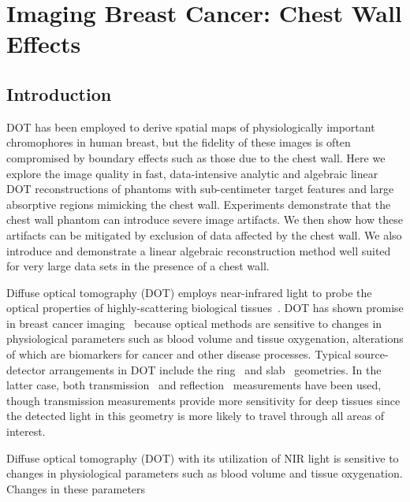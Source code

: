\chapter{Imaging Breast Cancer: Chest Wall Effects}


\section{Introduction}

DOT has been employed to derive spatial maps of physiologically important chromophores in human breast, but the fidelity of these images is often compromised by boundary effects such as those due to the chest wall.  Here we explore the image quality in fast, data-intensive analytic and algebraic linear DOT reconstructions of phantoms with sub-centimeter target features and large absorptive regions mimicking the chest wall. Experiments demonstrate that the chest wall phantom can introduce severe image artifacts.  We then show how these artifacts can be mitigated by exclusion of data affected by the chest wall. We also introduce and demonstrate a linear algebraic reconstruction method well suited for very large data sets in the presence of a chest wall.

Diffuse optical tomography (DOT) employs near-infrared light to probe the optical properties of highly-scattering biological tissues~\cite{arridge_99_1,boas_01_1,arridge_09_1}. DOT has shown
promise in breast cancer imaging~\cite{colak_99_1,hawrysz_00_1,mcbride_01_1,culver_03_1,intes_03_1,li_03_1,choe_05_1,yates_05_1,corlu_07_1,cerussi_07_1,choe_09_1,durduran_10_1} because optical methods are sensitive to changes in physiological parameters such as blood volume and tissue oxygenation, alterations of which are biomarkers for cancer and other disease processes.  Typical source-detector arrangements in DOT include the ring~\cite{pogue_95_1} and slab~\cite{grosenick_05_1,pifferi_03_1,choe_09_1} geometries. In the latter case, both transmission~\cite{choe_09_1} and reflection~\cite{ge_08_1} measurements have been used, though transmission measurements provide more sensitivity for deep tissues since the detected light in this geometry is more likely to travel through all areas of interest.


Diffuse optical tomography (DOT) with its utilization of NIR light is sensitive to changes in physiological parameters such as blood volume and tissue oxygenation. Changes in these parameters



